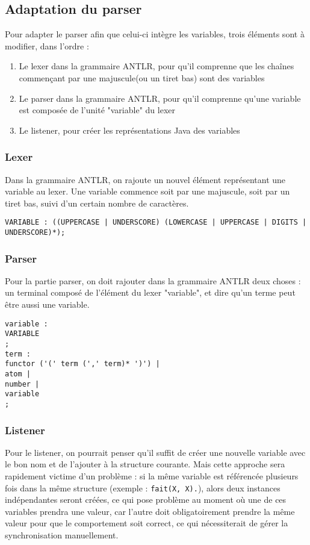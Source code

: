 \documentclass[../report.tex]{subfiles}
\begin{document}
\subsection{Adaptation du parser}
Pour adapter le parser afin que celui-ci intègre les variables, trois éléments sont à modifier, dans l'ordre :
\begin{enumerate}
    \item Le lexer dans la grammaire ANTLR, pour qu'il comprenne que les chaînes commençant par une majuscule(ou un tiret bas) sont des variables
    \item Le parser dans la grammaire ANTLR, pour qu'il comprenne qu'une variable est composée de l'unité "variable" du lexer
    \item Le listener, pour créer les représentations Java des variables
\end{enumerate}
\subsubsection{Lexer}
Dans la grammaire ANTLR, on rajoute un nouvel élément représentant une variable au lexer. Une variable commence soit par une majuscule, soit par un tiret bas, suivi d'un certain nombre de caractères.
\begin{verbatim}
VARIABLE : ((UPPERCASE | UNDERSCORE) (LOWERCASE | UPPERCASE | DIGITS | UNDERSCORE)*);
\end{verbatim}
\subsubsection{Parser}
Pour la partie parser, on doit rajouter dans la grammaire ANTLR deux choses : un terminal composé de l'élément du lexer "variable", et dire qu'un terme peut être aussi une variable.
\begin{verbatim}
variable :
VARIABLE
;
term :
functor ('(' term (',' term)* ')') |
atom | 
number |
variable
;
\end{verbatim}
\subsubsection{Listener}\label{subsubsec:phase2listener}
Pour le listener, on pourrait penser qu'il suffit de créer une nouvelle variable avec le bon nom et de l'ajouter à la structure courante. Mais cette approche sera rapidement victime d'un problème : si la même variable est référencée plusieurs fois dans la même structure (exemple : \texttt{fait(X, X).}), alors deux instances indépendantes seront créées, ce qui pose problème au moment où une de ces variables prendra une valeur, car l'autre doit obligatoirement prendre la même valeur pour que le comportement soit correct, ce qui nécessiterait de gérer la synchronisation manuellement.
\end{document}
